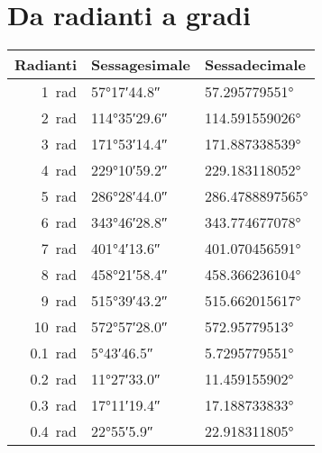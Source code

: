 \section{Da radianti a gradi}
\begin{center}
	\begin{tabular}{rll}
	\toprule
	Radianti & Sessagesimale & Sessadecimale \\ 
	\midrule
\SI{1}{\radian}	&\ang{57;17;44.8}  &\ang[round-precision=\lungarrotandamento,round-mode=places]{57.295779551}  \\ 
\SI{2}{\radian}	&\ang{114;35;29.6}  &\ang[round-precision=\lungarrotandamento,round-mode=places]{114.591559026}  \\ 
\SI{3}{\radian}	&\ang{171;53;14.4}  &\ang[round-precision=\lungarrotandamento,round-mode=places]{171.887338539}  \\ 
\SI{4}{\radian}	&\ang{229;10;59.2}  &\ang[round-precision=\lungarrotandamento,round-mode=places]{229.183118052}  \\ 
\SI{5}{\radian}	&\ang{286;28;44.0}  &\ang[round-precision=\lungarrotandamento,round-mode=places]{286.4788897565}  \\
\SI{6}{\radian}	&\ang{343;46;28.8}  &\ang[round-precision=\lungarrotandamento,round-mode=places]{343.774677078}  \\  
\SI{7}{\radian}	&\ang{401;4;13.6}  &\ang[round-precision=\lungarrotandamento,round-mode=places]{401.070456591}  \\ 
\SI{8}{\radian}	&\ang{458;21;58.4}  &\ang[round-precision=\lungarrotandamento,round-mode=places]{458.366236104}  \\ 
\SI{9}{\radian}	&\ang{515;39;43.2}  &\ang[round-precision=\lungarrotandamento,round-mode=places]{515.662015617}  \\ 
\SI{10}{\radian}	&\ang{572;57;28.0}  &\ang[round-precision=\lungarrotandamento,round-mode=places]{572.95779513}  \\ 
\midrule
\SI{0.1}{\radian}	&\ang{5;43;46.5}  &\ang[round-precision=\lungarrotandamento,round-mode=places]{5.7295779551}  \\
\SI{0.2}{\radian}	&\ang{11;27;33.0}  &\ang[round-precision=\lungarrotandamento,round-mode=places]{11.459155902}  \\
\SI{0.3}{\radian}	&\ang{17;11;19.4}  &\ang[round-precision=\lungarrotandamento,round-mode=places]{17.188733833}  \\
\SI{0.4}{\radian}	&\ang{22;55;5.9}  &\ang[round-precision=\lungarrotandamento,round-mode=places]{22.918311805}  \\

\end{tabular}
\end{center}
